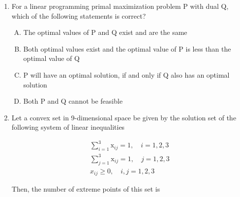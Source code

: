 \documentclass[journal,12pt,twocolumn]{IEEEtran}
\begin{document}
\begin{enumerate}
\begin{enumerate}[(A)]
\end{enumerate}

\item For a linear programming primal maximization problem P with dual Q, which of the following statements is correct?
\begin{enumerate}[(A)]
\setlength\itemsep{1em}
\item The optimal values of P and Q exist and are the same
\item Both optimal values exist and the optimal value of P is less than the optimal value of Q
\item P will have an optimal solution, if and only if Q also has an optimal solution
\item Both P and Q cannot be feasible
\end{enumerate}

\item Let a convex set in 9-dimensional space be given by the solution set of the following system of linear inequalities
\begin{center}
\begin{align*}
\sum_{i=1}^{3} \text{x}_{ij} = 1,  \quad  i = 1,2,3 \\
\sum_{j=1}^{3} \text{x}_{ij} = 1,  \quad  j = 1,2,3 \\
x_{ij} \geqslant 0, \quad i,j = 1,2,3    
\end{align*}
\end{center}
\smallskip
Then, the number of extreme points of this set is
\begin{enumerate}[(A)]
\end{enumerate}


\end{enumerate}
\end{document}

